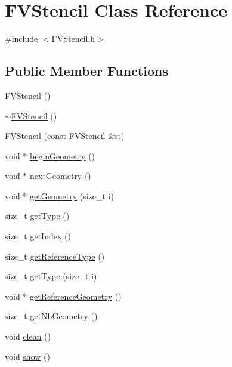 \hypertarget{classFVStencil}{
\section{FVStencil Class Reference}
\label{d3/d29/classFVStencil}
}


{\ttfamily \#include $<$FVStencil.h$>$}

\subsection*{Public Member Functions}
\begin{DoxyCompactItemize}
\item 
\hyperlink{classFVStencil_abe323f23f20253e4f0732f76519d611d}{FVStencil} ()
\item 
\hyperlink{classFVStencil_ad9ce349d4bd2d08d970943e47e0fc3fb}{$\sim$FVStencil} ()
\item 
\hyperlink{classFVStencil_acc34bddee6d41971ae7b4425254bb5a3}{FVStencil} (const \hyperlink{classFVStencil}{FVStencil} \&st)
\item 
void $\ast$ \hyperlink{classFVStencil_afbfae7a493f514f96af208b73d1336b2}{beginGeometry} ()
\item 
void $\ast$ \hyperlink{classFVStencil_a484f74785f318a09811aa0ecc7e40150}{nextGeometry} ()
\item 
void $\ast$ \hyperlink{classFVStencil_ac215cf3defe013cbed6a69d1fac9787a}{getGeometry} (size\_\-t i)
\item 
size\_\-t \hyperlink{classFVStencil_a74ab61efe1dd84c16c6f76179fb6f76c}{getType} ()
\item 
size\_\-t \hyperlink{classFVStencil_ab00c0a65e8424f5640f369bbf6f8ccea}{getIndex} ()
\item 
size\_\-t \hyperlink{classFVStencil_a6b6dda042f3f8a07b9789cb35b719f20}{getReferenceType} ()
\item 
size\_\-t \hyperlink{classFVStencil_a456fe2c00099965cd8b4597187f5c1a3}{getType} (size\_\-t i)
\item 
void $\ast$ \hyperlink{classFVStencil_a270d27e05efea4b490b7d8fa7bcf379d}{getReferenceGeometry} ()
\item 
size\_\-t \hyperlink{classFVStencil_afc6b28968b6632bd16c8a1ae5d1f3ca2}{getNbGeometry} ()
\item 
void \hyperlink{classFVStencil_a2bbe646c052baf99f04a367ef6031d74}{clean} ()
\item 
void \hyperlink{classFVStencil_a4b148f40a95444d5669406b918ad2f52}{show} ()
\item 

\end{DoxyCompactItemize}
